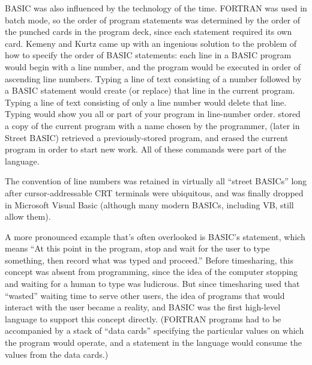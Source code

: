 \documentclass{article}
\begin{document}


BASIC was also influenced by the technology of the time.  
FORTRAN was used in batch mode, so the order of program statements was
determined by the order of the punched cards in the program deck, since
each statement required its own card.
Kemeny and Kurtz came up with an ingenious solution to the problem of
how to specify the order of BASIC statements: each line in a BASIC
program would begin with a line number, and the program would be
executed in order of ascending line numbers.
Typing a line of text consisting of a number followed by a BASIC statement
would create (or replace) that line in the current program.
Typing a line of text consisting of only a line number would delete that line.
Typing  would show
you all or part of your program in line-number order.
 stored a copy of the current program with a name
chosen by the programmer,  (later  in Street BASIC)
retrieved a previously-stored program, and  erased the current
program in order to start new work.  All of these commands were part
of the language.

  \begin{geeknote}
  The convention of line numbers was retained in virtually all ``street
  BASICs'' long after cursor-addressable CRT terminals were ubiquitous,
  and was finally dropped in Microsoft Visual Basic (although many modern
  BASICs, including VB, still allow them).
  \end{geeknote}

A more pronounced example that's often overlooked is BASIC's 
statement, which means ``At this point in the program, stop and wait for
the user to type something, then record what was typed and proceed.''
Before timesharing, this concept was absent from programming, since the
idea of the computer stopping and waiting for a human to type was
ludicrous.  But since timesharing used that ``wasted'' waiting time to
serve other users, the idea of programs that would interact with the
user became a reality, and BASIC was the first high-level language to
support this concept directly.  (FORTRAN programs had to be accompanied
by a stack of ``data cards'' specifying the particular values on which
the program would operate, and a  statement in the language
would consume the values from the data cards.)
\end{document}
